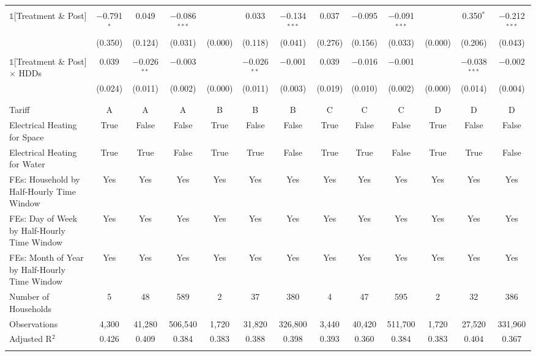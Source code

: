 \begin{table}[!htbp]
\begin{tabular}{@{\extracolsep{20pt}}lcccccccccccc}
  & & & & & & & & & & & & \\ 
 $\mathbb{1}$[Treatment \& Post] & $-$0.791$^{*}$ & 0.049 & $-$0.086$^{***}$ &  & 0.033 & $-$0.134$^{***}$ & 0.037 & $-$0.095 & $-$0.091$^{***}$ &  & 0.350$^{*}$ & $-$0.212$^{***}$ \\ 
  & (0.350) & (0.124) & (0.031) & (0.000) & (0.118) & (0.041) & (0.276) & (0.156) & (0.033) & (0.000) & (0.206) & (0.043) \\ 
  & & & & & & & & & & & & \\ 
 $\mathbb{1}$[Treatment \& Post] $\times$ HDDs & 0.039 & $-$0.026$^{**}$ & $-$0.003 &  & $-$0.026$^{**}$ & $-$0.001 & 0.039 & $-$0.016 & $-$0.001 &  & $-$0.038$^{***}$ & $-$0.002 \\ 
  & (0.024) & (0.011) & (0.002) & (0.000) & (0.011) & (0.003) & (0.019) & (0.010) & (0.002) & (0.000) & (0.014) & (0.004) \\ 
  & & & & & & & & & & & & \\ 
\hline \\[-1.8ex] 
Tariff & A & A & A & B & B & B & C & C & C & D & D & D \\ 
Electrical Heating for Space & True & False & False & True & False & False & True & False & False & True & False & False \\ 
Electrical Heating for Water & True & True & False & True & True & False & True & True & False & True & True & False \\ 
FEs: Household by Half-Hourly Time Window & Yes & Yes & Yes & Yes & Yes & Yes & Yes & Yes & Yes & Yes & Yes & Yes \\ 
FEs: Day of Week by Half-Hourly Time Window & Yes & Yes & Yes & Yes & Yes & Yes & Yes & Yes & Yes & Yes & Yes & Yes \\ 
FEs: Month of Year by Half-Hourly Time Window & Yes & Yes & Yes & Yes & Yes & Yes & Yes & Yes & Yes & Yes & Yes & Yes \\ 
Number of Households &   5 &  48 & 589 &   2 &  37 & 380 &   4 &  47 & 595 &   2 &  32 & 386 \\ 
Observations & 4,300 & 41,280 & 506,540 & 1,720 & 31,820 & 326,800 & 3,440 & 40,420 & 511,700 & 1,720 & 27,520 & 331,960 \\ 
Adjusted R$^{2}$ & 0.426 & 0.409 & 0.384 & 0.383 & 0.388 & 0.398 & 0.393 & 0.360 & 0.384 & 0.383 & 0.404 & 0.367 \\ 
\hline 
\hline \\[-1.8ex] 
\end{tabular} 
\end{table} 
